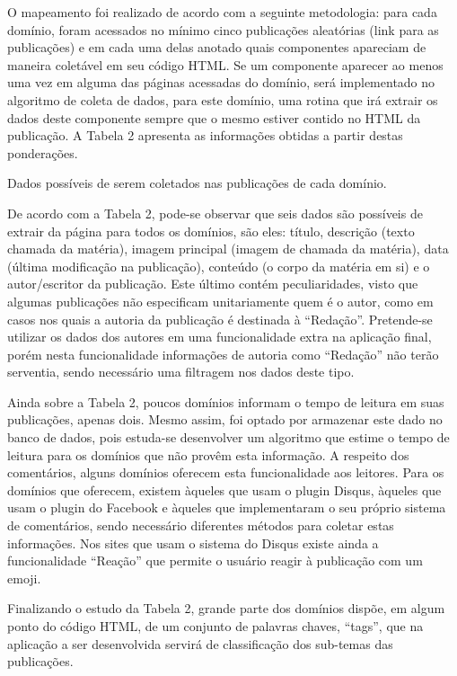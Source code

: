 O mapeamento foi realizado de acordo com a seguinte metodologia: para cada domínio, foram acessados no mínimo cinco publicações aleatórias (link para as publicações) e em cada uma delas anotado quais componentes apareciam de maneira coletável em seu código HTML. Se um componente aparecer ao menos uma vez em alguma das páginas acessadas do domínio, será implementado no algoritmo de coleta de dados, para este domínio, uma rotina que irá extrair os dados deste componente sempre que o mesmo estiver contido no HTML da publicação. A Tabela 2 apresenta as informações obtidas a partir destas ponderações.  

\begin{table}[H]
\noindent\makebox[\textwidth]{%
}
\caption{Dados possíveis de serem coletados nas publicações de cada domínio.}
\end{table}

De acordo com a Tabela 2, pode-se observar que seis dados são possíveis de extrair da página para todos os domínios, são eles: título, descrição (texto chamada da matéria), imagem principal (imagem de chamada da matéria), data (última modificação na publicação), conteúdo (o corpo da matéria em si) e o autor/escritor da publicação. Este último contém peculiaridades, visto que algumas publicações não especificam unitariamente quem é o autor, como em casos nos quais a autoria da publicação é destinada à “Redação”. Pretende-se utilizar os dados dos autores em uma funcionalidade extra na aplicação final, porém nesta funcionalidade informações de autoria como “Redação” não terão serventia, sendo necessário uma filtragem nos dados deste tipo.

Ainda sobre a Tabela 2, poucos domínios informam o tempo de leitura em suas publicações, apenas dois. Mesmo assim, foi optado por armazenar este dado no banco de dados, pois estuda-se desenvolver um algoritmo que estime o tempo de leitura para os domínios que não provêm esta informação. A respeito dos comentários, alguns domínios oferecem esta funcionalidade aos leitores. Para os domínios que oferecem, existem àqueles que usam o plugin Disqus, àqueles que usam o plugin do Facebook e àqueles que implementaram o seu próprio sistema de comentários, sendo necessário diferentes métodos para coletar estas informações. Nos sites que usam o sistema do Disqus existe ainda a funcionalidade “Reação” que permite o usuário reagir à publicação com um emoji.

Finalizando o estudo da Tabela 2, grande parte dos domínios dispõe, em algum ponto do código HTML, de um conjunto de palavras chaves, “tags”, que na aplicação a ser desenvolvida servirá de classificação dos sub-temas das publicações.

